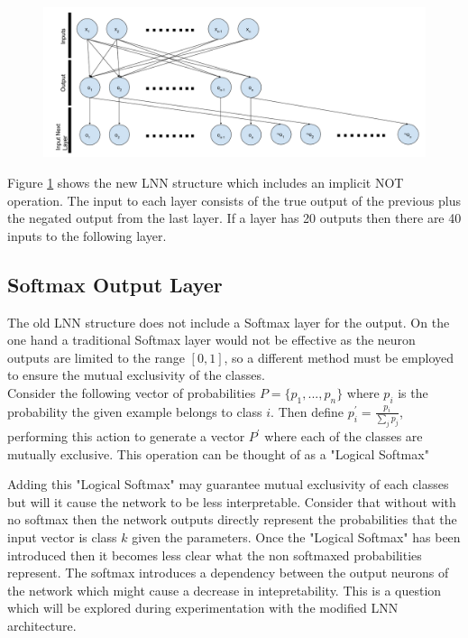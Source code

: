 \begin{figure}[H]
	\centering
	\begin{minipage}[b]{0.9\textwidth}
		\includegraphics[width=\textwidth]{Modified-LNN-Structure.png}
		\caption{}
		\label{fig:modified-lnn-structure}
	\end{minipage}
	\hfill
\end{figure}


Figure \ref{fig:modified-lnn-structure} shows the new LNN structure which includes an implicit NOT operation. The input to each layer consists of the true output of the previous plus the negated output from the last layer. If a layer has 20 outputs then there are 40 inputs to the following layer.\\

\subsection{Softmax Output Layer}
The old LNN structure does not include a Softmax layer for the output. On the one hand a traditional Softmax layer would not be effective as the neuron outputs are limited to the range $[0,1]$, so a different method must be employed to ensure the mutual exclusivity of the classes.\\

Consider the following vector of probabilities $P = \{p_1, ..., p_n\}$ where $p_i$ is the probability the given example belongs to class $i$. Then define $p_i^{'} = \frac{p_i}{\sum_j p_j}$, performing this action to generate a vector $P^{'}$ where each of the classes are mutually exclusive. This operation can be thought of as a "Logical Softmax"

Adding this "Logical Softmax" may guarantee mutual exclusivity of each classes but will it cause the network to be less interpretable. Consider that without with no softmax then the network outputs directly represent the probabilities that the input vector is class $k$ given the parameters. Once the "Logical Softmax" has been introduced then it becomes less clear what the non softmaxed probabilities represent. The softmax introduces a dependency between the output neurons of the network which might cause a decrease in intepretability. This is a question which will be explored during experimentation with the modified LNN architecture.

